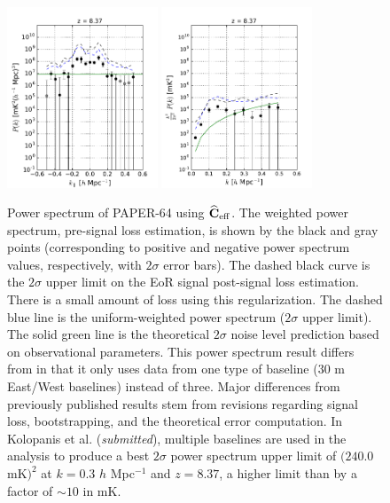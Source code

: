 \documentclass[preprint2,numberedappendix,tighten]{aastex6}
\begin{document}
\begin{figure}
	\centering
	\includegraphics[width=0.4\textwidth]{plots/ps1_data_add.pdf}
	\includegraphics[width=0.4\textwidth]{plots/ps2_data_add.pdf}
	\caption{Power spectrum of PAPER-64 using $\widehat{\textbf{C}}_{\rm eff}$. The weighted power spectrum, pre-signal loss estimation, is shown by the black and gray points (corresponding to positive and 
negative power spectrum values, respectively, with $2\sigma$ error bars). The dashed black curve is the $2\sigma$ upper limit on the EoR signal post-signal loss estimation. There is a small amount of loss using this regularization. The dashed blue line is the uniform-weighted 
power spectrum ($2\sigma$ upper limit). The solid green line is the theoretical $2\sigma$ noise level prediction based on 
observational parameters. This power spectrum result differs from  in that it only uses data from one type of baseline ($30$ m 
East/West baselines) instead of three. Major differences from previously published results stem from revisions regarding signal 
loss, bootstrapping, and the theoretical error computation. In Kolopanis et al. (\textit{submitted}), multiple baselines are used in the analysis to produce a best $2\sigma$ power spectrum upper limit of $(240.0$ mK$)^{2}$ at $k=0.3$ $h$ Mpc$^{-1}$ and $z=8.37$, 
a higher limit than  by a factor of $\sim$$10$ in mK.}
	\label{fig:ps1_data}
\end{figure}
\end{document}
